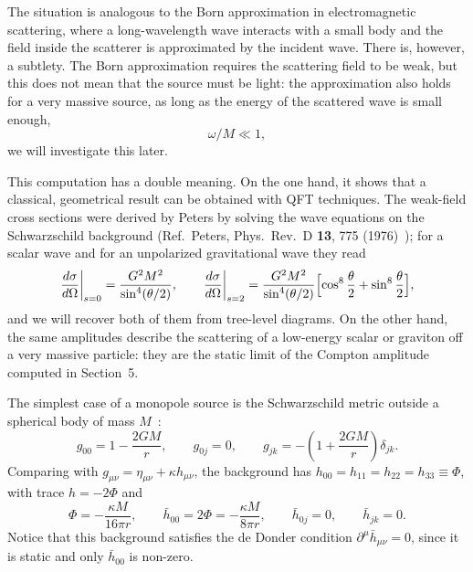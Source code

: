 \documentclass[12pt,a4paper,oneside]{article}
\numberwithin{equation}{section}   %
\begin{document}
The situation is analogous to the Born approximation in electromagnetic
scattering, where a long-wavelength wave interacts with a small body and the
field inside the scatterer is approximated by the incident wave.
There is, however, a subtlety. The Born approximation requires the scattering
field to be weak, but this does not mean that the source must be light: the
approximation also holds for a very massive source, as long as the energy of
the scattered wave is small enough,
\begin{equation}
    \omega/M\ll1 ,
\end{equation}
we will investigate this later.

This computation has a double meaning. On the one hand, it shows that a
classical, geometrical result can be obtained with QFT techniques. The
weak-field cross sections were derived by Peters by solving the wave equations
on the Schwarzschild background (Ref.\ Peters, Phys.\ Rev.\ D \textbf{13}, 775
(1976)~\cite{Peters1976}); for a scalar wave and for an unpolarized gravitational wave they read
\begin{equation}
    \label{eq:peters}
    \frac{d\sigma}{d\Omega}\bigg|_{s=0}
    =\frac{G^2M^2}{\sin^{4}(\theta/2)},
    \qquad
    \frac{d\sigma}{d\Omega}\bigg|_{s=2}
    =\frac{G^2M^2}{\sin^{4}(\theta/2)}
    \Bigl[\cos^{8}\frac{\theta}{2}+\sin^{8}\frac{\theta}{2}\Bigr],
\end{equation}
and we will recover both of them from tree-level diagrams. On the other hand,
the same amplitudes describe the scattering of a low-energy scalar or graviton
off a very massive particle: they are the static limit of the Compton
amplitude computed in Section~5.

The simplest case of a monopole source is the
Schwarzschild metric outside a spherical body of mass $M$~\cite{Weinberg1972}:
\begin{equation}
    \label{eq:metric-schw}
    g_{00} = 1-\frac{2GM}{r}, \qquad
    g_{0j} = 0, \qquad
    g_{jk} = -\left(1+\frac{2GM}{r}\right)\delta_{jk}.
\end{equation}
Comparing with $g_{\mu\nu}=\eta_{\mu\nu}+\kappa h_{\mu\nu}$, the background has
$h_{00}=h_{11}=h_{22}=h_{33}\equiv\Phi$, with trace $h=-2\Phi$ and
\begin{equation}
    \label{eq:hbar-schw}
    \Phi=-\frac{\kappa M}{16\pi r},\qquad
    \bar h_{00}=2\Phi=-\frac{\kappa M}{8\pi r},\qquad \bar h_{0j}=0,\qquad \bar h_{jk}=0 .
\end{equation}
Notice that this background satisfies the de Donder condition
$\partial^\mu\bar h_{\mu\nu}=0$, since it is static and only $\bar h_{00}$ is
non-zero.
\end{document}
